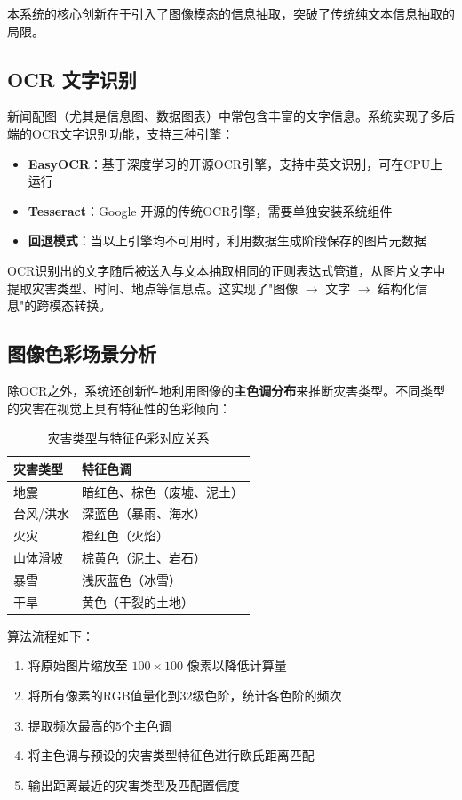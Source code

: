 \documentclass[12pt, a4paper]{ctexart}
\begin{document}
本系统的核心创新在于引入了图像模态的信息抽取，突破了传统纯文本信息抽取的局限。

\subsection{OCR 文字识别}

新闻配图（尤其是信息图、数据图表）中常包含丰富的文字信息。系统实现了多后端的OCR文字识别功能，支持三种引擎：

\begin{itemize}[itemsep=2pt]
    \item \textbf{EasyOCR}：基于深度学习的开源OCR引擎，支持中英文识别，可在CPU上运行
    \item \textbf{Tesseract}：Google 开源的传统OCR引擎，需要单独安装系统组件
    \item \textbf{回退模式}：当以上引擎均不可用时，利用数据生成阶段保存的图片元数据
\end{itemize}

OCR识别出的文字随后被送入与文本抽取相同的正则表达式管道，从图片文字中提取灾害类型、时间、地点等信息点。这实现了"图像 $\rightarrow$ 文字 $\rightarrow$ 结构化信息"的跨模态转换。

\subsection{图像色彩场景分析}

除OCR之外，系统还创新性地利用图像的\textbf{主色调分布}来推断灾害类型。不同类型的灾害在视觉上具有特征性的色彩倾向：

\begin{table}[H]
\centering
\caption{灾害类型与特征色彩对应关系}
\label{tab:colors}
\begin{tabular}{ll}
\toprule
\textbf{灾害类型} & \textbf{特征色调} \\
\midrule
地震 & 暗红色、棕色（废墟、泥土） \\
台风/洪水 & 深蓝色（暴雨、海水） \\
火灾 & 橙红色（火焰） \\
山体滑坡 & 棕黄色（泥土、岩石） \\
暴雪 & 浅灰蓝色（冰雪） \\
干旱 & 黄色（干裂的土地） \\
\bottomrule
\end{tabular}
\end{table}

算法流程如下：
\begin{enumerate}[itemsep=2pt]
    \item 将原始图片缩放至 $100 \times 100$ 像素以降低计算量
    \item 将所有像素的RGB值量化到32级色阶，统计各色阶的频次
    \item 提取频次最高的5个主色调
    \item 将主色调与预设的灾害类型特征色进行欧氏距离匹配
    \item 输出距离最近的灾害类型及匹配置信度
\end{enumerate}
\end{document}
